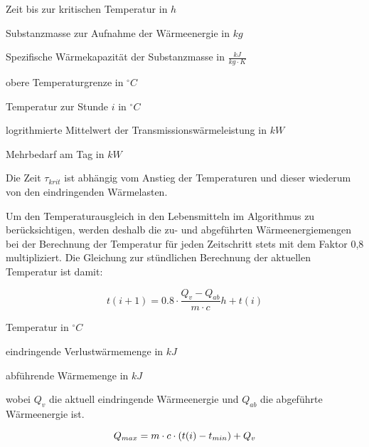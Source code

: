 \begin{description}[\dth]

	\item[$\tau_{krit}$] Zeit bis zur kritischen Temperatur in $h$
	\item[$m$] Substanzmasse zur Aufnahme der Wärmeenergie in $kg$
	\item[$c$] Spezifische Wärmekapazität der Substanzmasse in $\frac{kJ}{kg
		\cdot K}$
	\item[$t_{max}$] obere Temperaturgrenze in $ ^{\circ} C $
	\item[$t(i)$] Temperatur zur Stunde $i$ in $ ^{\circ} C $
	\item[$\aptranslog$] logrithmierte Mittelwert der
		Transmissionswärmeleistung in $kW$
	\item[$\pmehr$] Mehrbedarf am Tag in $kW$

\end{description}
\vspace{0.5cm}

Die Zeit $\tau_{krit}$ ist abhängig vom Anstieg der Temperaturen und dieser
wiederum von den eindringenden Wärmelasten.

Um den Temperaturausgleich in den Lebensmitteln im Algorithmus zu
berücksichtigen, werden deshalb die zu- und abgeführten Wärmeenergiemengen bei
der Berechnung der Temperatur für jeden Zeitschritt stets mit dem Faktor 0,8
multipliziert.  Die Gleichung zur stündlichen Berechnung der aktuellen
Temperatur ist damit:

\begin{equation}
	t(i+1) = 0.8 \cdot \frac{Q_v - Q_{ab}}{m \cdot c}h + t(i)
\label{tns}
\end{equation}

\begin{description}[\dth]

	\item[$t$] Temperatur in $^{\circ} C$
	\item[$Q_v$] eindringende Verlustwärmemenge in $kJ$
	\item[$Q_{ab}$] abführende Wärmemenge in $kJ$

\end{description}
\vspace{0.5cm}

wobei $Q_v$ die aktuell eindringende Wärmeenergie und $Q_{ab}$ die abgeführte
Wärmeenergie ist.

\begin{equation}
	\emax = m \cdot c \cdot (t(i) - t_{min}) + Q_v
\label{emax}
\end{equation}

